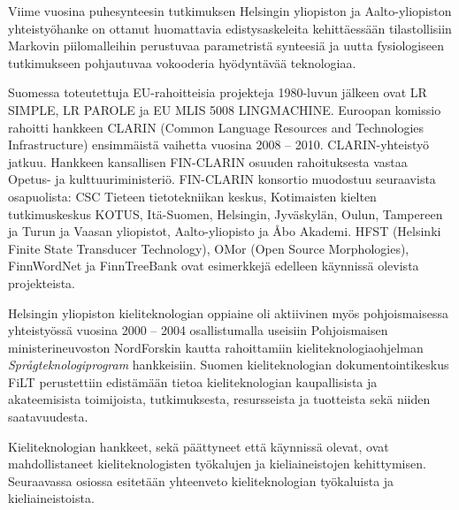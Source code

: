 \documentclass[]{../../metanetpaper}
\begin{document}
\begin{Parallel}[c]{70mm}{70mm}
{Viime vuosina puhesynteesin tutkimuksen Helsingin yliopiston ja
Aalto-yliopiston yhteistyöhanke on ottanut huomattavia
edistysaskeleita kehittäessään tilastollisiin Markovin piilomalleihin
perustuvaa parametristä synteesiä ja uutta fysiologiseen tutkimukseen
pohjautuvaa vokooderia hyödyntävää teknologiaa.

Suomessa toteutettuja EU-rahoitteisia projekteja 1980-luvun jälkeen
ovat LR SIMPLE, LR PAROLE ja EU MLIS 5008 LINGMACHINE. Euroopan
komissio rahoitti hankkeen CLARIN (Common Language Resources and
Technologies Infrastructure) ensimmäistä vaihetta vuosina 2008 –
2010. CLARIN-yhteistyö jatkuu. Hankkeen kansallisen FIN-CLARIN osuuden
rahoituksesta vastaa Opetus- ja kulttuuriministeriö. FIN-CLARIN
konsortio muodostuu seuraavista osapuolista: CSC Tieteen
tietotekniikan keskus, Kotimaisten kielten tutkimuskeskus KOTUS,
Itä-Suomen, Helsingin, Jyväskylän, Oulun, Tampereen ja Turun ja Vaasan
yliopistot, Aalto-yliopisto ja Åbo Akademi. HFST (Helsinki Finite
State Transducer Technology), OMor (Open Source Morphologies),
FinnWordNet ja FinnTreeBank ovat esimerkkejä edelleen käynnissä
olevista projekteista.

Helsingin yliopiston kieliteknologian oppiaine oli aktiivinen myös
pohjoismaisessa yhteistyössä vuosina 2000 – 2004 osallistumalla
useisiin Pohjoismaisen ministerineuvoston NordForskin kautta
rahoittamiin kieliteknologiaohjelman \textit{Språgteknologiprogram}
hankkeisiin. Suomen kieliteknologian dokumentointikeskus FiLT
perustettiin edistämään tietoa kieliteknologian kaupallisista ja
akateemisista toimijoista, tutkimuksesta, resursseista ja tuotteista
sekä niiden saatavuudesta.

Kieliteknologian hankkeet, sekä päättyneet että käynnissä olevat, ovat
mahdollistaneet kieliteknologisten työkalujen ja kieliaineistojen
kehittymisen.  Seuraavassa osiossa esitetään yhteenveto
kieliteknologian työkaluista ja kieliaineistoista.
}

\end{Parallel}
\end{document}
